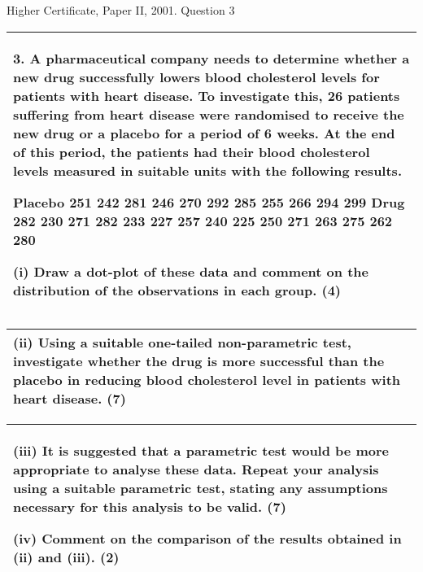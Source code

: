 \documentclass[a4paper,12pt]{article}
\begin{document}

Higher Certificate, Paper II, 2001. Question 3\begin{table}[ht!]
 
\centering
 
\begin{tabular}{|p{15cm}|}
 
\hline  

3. A pharmaceutical company needs to determine whether a new drug successfully lowers blood cholesterol levels for patients with heart disease.  To investigate this, 26 patients suffering from heart disease were randomised to receive the new drug or a placebo for a period of 6 weeks.  At the end of this period, the patients had their blood cholesterol levels measured in suitable units with the following results. 
 
       Placebo 251  242  281  246  270  292  285  255  266  294  299 
        Drug  282  230  271  282  233  227  257  240  225  250  271  263  275  262  280 
 
(i) Draw a dot-plot of these data and comment on the distribution of the observations in each group. (4) 
 
\\ \hline
  
\end{tabular}

\end{table}  

\begin{table}[ht!]
 
\centering
 
\begin{tabular}{|p{15cm}|}
 
\hline  

(ii) Using a suitable one-tailed non-parametric test, investigate whether the drug is more successful than the placebo in reducing blood cholesterol level in patients with heart disease. (7) 
 

\\ \hline
  
\end{tabular}

\end{table} 

\begin{table}[ht!]
 
\centering
 
\begin{tabular}{|p{15cm}|}
 
\hline  

(iii) It is suggested that a parametric test would be more appropriate to analyse these data.  Repeat your analysis using a suitable parametric test, stating any assumptions necessary for this analysis to be valid. (7) 
 
(iv) Comment on the comparison of the results obtained in (ii) and (iii). 
(2) 
\\ \hline
  
\end{tabular}

\end{table} 
\end{document}

